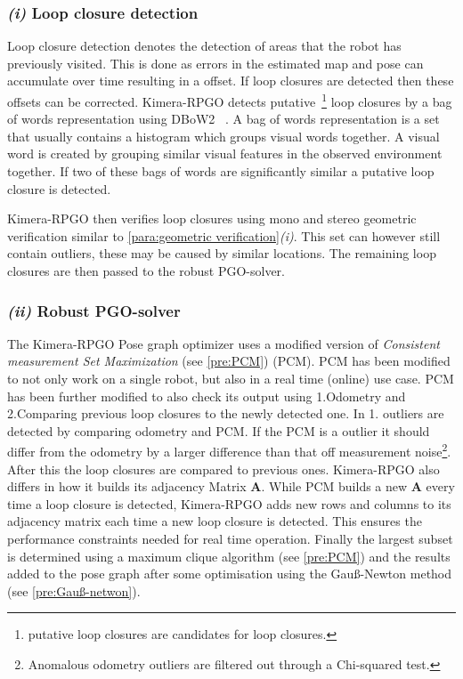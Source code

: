 \documentclass[11pt,a4paper]{article}
\newcommand{\M}[1]{\mathbf{#1}}
\begin{document}
\subsubsection*{\textit{(i)} Loop closure detection}
Loop closure detection denotes the detection of areas that the robot has previously visited.
This is done as errors in the estimated map and pose can accumulate over time resulting in a offset.
If loop closures are detected then these offsets can be corrected. 
Kimera-RPGO detects putative~\footnote{putative loop closures are candidates for loop closures.} loop closures by a bag of words representation using DBoW2~\cite{dbow2} . 
A bag of words representation is a set that usually contains a histogram which groups visual words together. 
A visual word is created by grouping similar visual features in the observed environment together.
If two of these bags of words are significantly similar a putative loop closure is detected. 

Kimera-RPGO then verifies loop closures using mono and stereo geometric verification similar to \ref{para:geometric verification}\textit{(i)}. This set can however still contain outliers, these may be caused by similar locations.
The remaining loop closures are then passed to the robust PGO-solver.

\subsubsection*{\textit{(ii)} Robust PGO-solver} 
The Kimera-RPGO Pose graph optimizer uses a modified version of \textit{Consistent measurement Set Maximization} (see \ref{pre:PCM}) (PCM). PCM has been modified to not only work on a single robot, but also in a real time (online) use case.
PCM has been further modified to also check its output using 1.Odometry and 2.Comparing previous loop closures to the newly detected one. 
In 1. outliers are detected by comparing odometry and PCM. 
If the PCM is a outlier it should differ from the odometry by a larger difference than that off measurement noise\footnote{Anomalous odometry outliers are filtered out through a Chi-squared test.}. After this the loop closures are compared to previous ones. 
Kimera-RPGO also differs in how it builds its adjacency Matrix $\M{A}$.
While PCM builds a new $\M{A}$ every time a loop closure is detected, Kimera-RPGO adds new rows and columns to its adjacency matrix each time a new loop closure is detected. This ensures the performance constraints needed for real time operation.
Finally the largest subset is determined using a maximum clique algorithm (see \ref{pre:PCM}) and the results added to the pose graph after some optimisation using the Gauß-Newton method (see \ref{pre:Gauß-netwon}).
\end{document}
